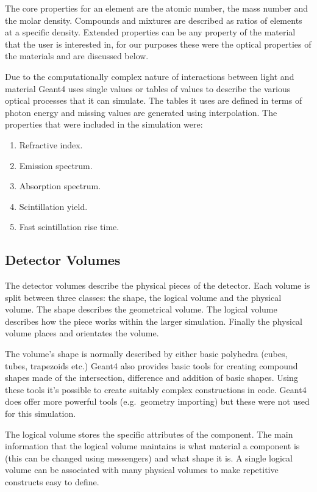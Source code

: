 The core properties for an element are the atomic number, the mass number and the molar density. Compounds and mixtures are described as ratios of elements at a specific density. Extended properties can be any property of the material that the user is interested in, for our purposes these were the optical properties of the materials and are discussed below.

Due to the computationally complex nature of interactions between light and material Geant4 uses single values or tables of values to describe the various optical processes that it can simulate. The tables it uses are defined in terms of photon energy and missing values are generated using interpolation. The properties that were included in the simulation were:
\begin{enumerate}
  \item Refractive index.
  \item Emission spectrum.
  \item Absorption spectrum. 
  \item Scintillation yield.
  \item Fast scintillation rise time.
\end{enumerate}

\subsection{Detector Volumes} %
\label{sub:detector_volumes}
The detector volumes describe the physical pieces of the detector. Each volume is split between three classes: the shape, the logical volume and the physical volume. The shape describes the geometrical volume. The logical volume describes how the piece works within the larger simulation. Finally the physical volume places and orientates the volume. 

The volume's shape is normally described by either basic polyhedra (cubes, tubes, trapezoids etc.) Geant4 also provides basic tools for creating compound shapes made of the intersection, difference and addition of basic shapes. Using these tools it's possible to create suitably complex constructions in code. Geant4 does offer more powerful tools (e.g.\ geometry importing) but these were not used for this simulation.

The logical volume stores the specific attributes of the component. The main information that the logical volume maintains is what material a component is (this can be changed using messengers) and what shape it is. A single logical volume can be associated with many physical volumes to make repetitive constructs easy to define.

